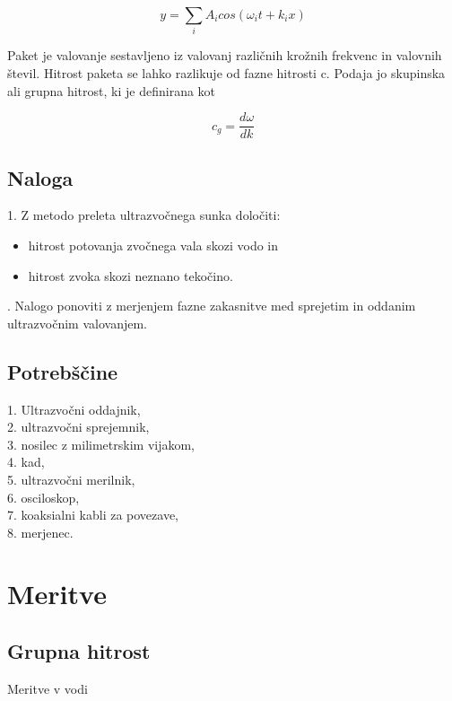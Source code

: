 \documentclass[a4paper]{report}
\begin{document}
\[y=\sum_i A_i cos(\omega_i t + k_ix)\]

\noindent Paket je valovanje sestavljeno iz valovanj različnih krožnih frekvenc in valovnih števil. Hitrost paketa se lahko razlikuje od fazne hitrosti c. Podaja jo skupinska ali grupna hitrost, ki je definirana kot

\[c_g = \frac{d\omega}{dk}\]
\section*{Naloga}
1. Z metodo preleta ultrazvočnega sunka določiti:
\begin{itemize}
\item hitrost potovanja zvočnega vala skozi vodo in
\item hitrost zvoka skozi neznano tekočino.
\end{itemize}
 
. Nalogo ponoviti z merjenjem fazne zakasnitve med sprejetim in oddanim ultrazvočnim valovanjem.

\section*{Potrebščine}
1. Ultrazvočni oddajnik,\\
2. ultrazvočni sprejemnik,\\
3. nosilec z milimetrskim vijakom,\\
4. kad,\\
5. ultrazvočni merilnik,\\
6. osciloskop,\\
7. koaksialni kabli za povezave,\\
8. merjenec.

\chapter*{Meritve}
\section*{Grupna hitrost}
Meritve v vodi
\end{document}
